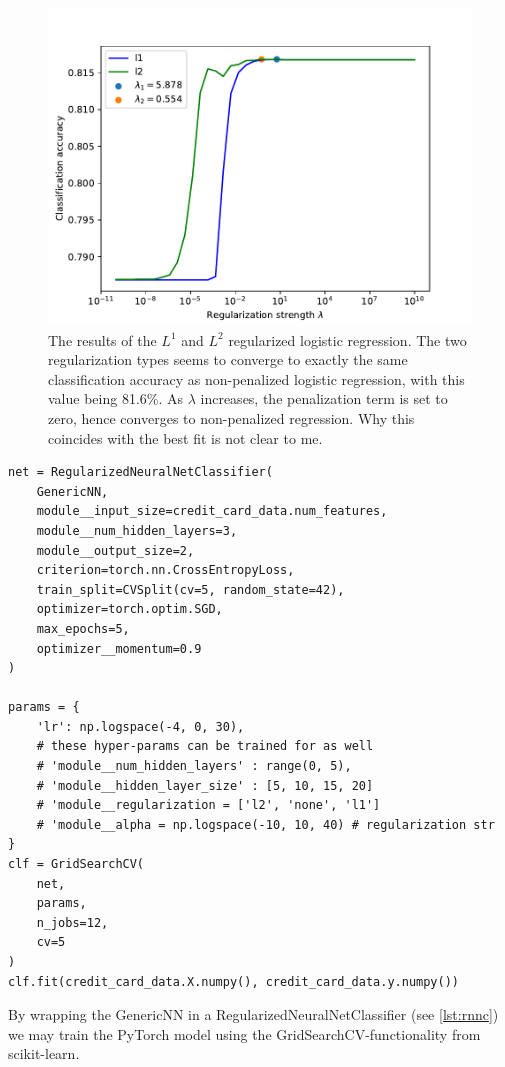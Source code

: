 \documentclass[a4paper, oneside, article]{memoir}
\begin{document}
	\begin{figure}[htpb]
		\centering
		\includegraphics[width=0.8\linewidth]{imgs/credit_card_classification.pdf}
		\caption{The results of the \( L^1 \) and \( L^2 \) regularized logistic regression. 
			The two regularization types seems to converge to
			exactly the same classification accuracy as
			non-penalized logistic regression, with this value being 81.6\%. As \( \lambda \)
			increases, the penalization term is set to zero, hence
			converges to non-penalized regression. Why this
			coincides with the best fit is not clear to me.
		}%
		\label{fig:credit_cards_classical}
	\end{figure}

	\begin{listing}
	\begin{verbatim}
net = RegularizedNeuralNetClassifier(
    GenericNN,
    module__input_size=credit_card_data.num_features,
    module__num_hidden_layers=3,
    module__output_size=2,
    criterion=torch.nn.CrossEntropyLoss,
    train_split=CVSplit(cv=5, random_state=42),
    optimizer=torch.optim.SGD,
    max_epochs=5,
    optimizer__momentum=0.9
)

params = {
    'lr': np.logspace(-4, 0, 30),
    # these hyper-params can be trained for as well
    # 'module__num_hidden_layers' : range(0, 5),
    # 'module__hidden_layer_size' : [5, 10, 15, 20]
    # 'module__regularization = ['l2', 'none', 'l1'] 
    # 'module__alpha = np.logspace(-10, 10, 40) # regularization str
}
clf = GridSearchCV(
    net,
    params,
    n_jobs=12,
    cv=5
)
clf.fit(credit_card_data.X.numpy(), credit_card_data.y.numpy())
	\end{verbatim}	
	\caption{By wrapping the GenericNN in a RegularizedNeuralNetClassifier
	(see \cref{lst:rnnc}) we may train the PyTorch model using the
	GridSearchCV-functionality from scikit-learn.}
	\label{lst:classification_nn}
	\end{listing}
\end{document}

